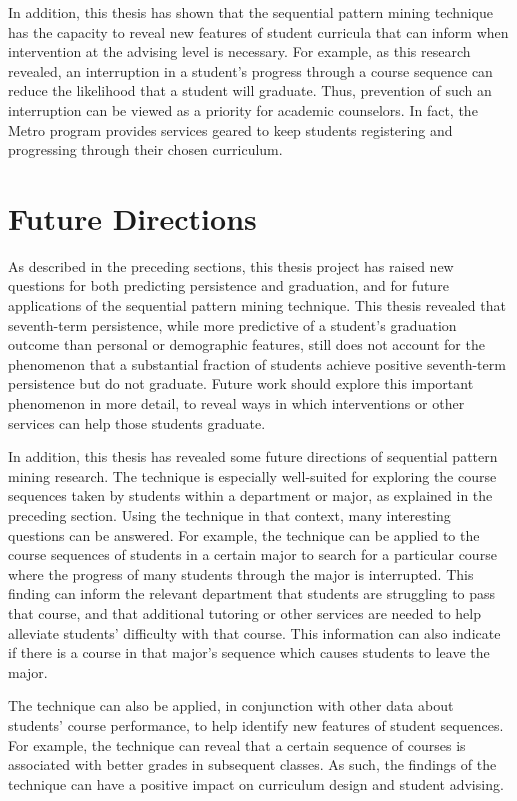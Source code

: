 In addition, this thesis has shown that the sequential pattern mining technique has the capacity to reveal new features of student curricula that can inform when intervention at the advising level is necessary.  For example, as this research revealed, an interruption in a student's progress through a course sequence can reduce the likelihood that a student will graduate.  Thus, prevention of such an interruption can be viewed as a priority for academic counselors.  In fact, the Metro program provides services geared to keep students registering and progressing through their chosen curriculum.

\section{Future Directions}

As described in the preceding sections, this thesis project has raised new questions for both predicting persistence and graduation, and for future applications of the sequential pattern mining technique.  This thesis revealed that seventh-term persistence, while more predictive of a student's graduation outcome than personal or demographic features, still does not account for the phenomenon that a substantial fraction of students achieve positive seventh-term persistence but do not graduate.  Future work should explore this important phenomenon in more detail, to reveal ways in which interventions or other services can help those students graduate.  

In addition, this thesis has revealed some future directions of sequential pattern mining research.  The technique is especially well-suited for exploring the course sequences taken by students within a department or major, as explained in the preceding section.  Using the technique in that context, many interesting questions can be answered.  For example, the technique can be applied to the course sequences of students in a certain major to search for a particular course where the progress of many students through the major is interrupted.  This finding can inform the relevant department that students are struggling to pass that course, and that additional tutoring or other services are needed to help alleviate students' difficulty with that course.  This information can also indicate if there is a course in that major's sequence which causes students to leave the major.   

The technique can also be applied, in conjunction with other data about students' course performance, to help identify new features of student sequences.  For example, the technique can reveal that a certain sequence of courses is associated with better grades in subsequent classes.  As such, the findings of the technique can have a positive impact on curriculum design and student advising.  

